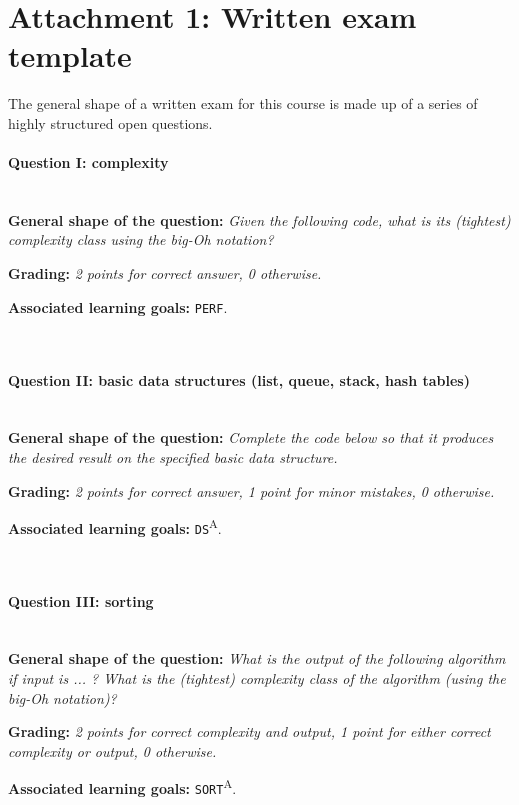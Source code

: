 \section*{Attachment 1: Written exam template}
The general shape of a written exam for this course is made up of a series of highly structured open questions.

\paragraph*{Question I: complexity} \ \\

\textbf{General shape of the question:} \textit{Given the following code, what is its (tightest) complexity class using the big-Oh notation?} \ 

\textbf{Grading:} \textit{2 points for correct answer, 0 otherwise.} \ 

\textbf{Associated learning goals:} \texttt{PERF}.

\ \\ 
\paragraph*{Question II: basic data structures (list, queue, stack, hash tables)} \ \\

\textbf{General shape of the question:} \textit{Complete the code below so that it produces the desired result on the specified basic data structure.} \ 

\textbf{Grading:} \textit{2 points for correct answer, 1 point for minor mistakes, 0 otherwise.} \ 

\textbf{Associated learning goals:} \texttt{DS}\textsuperscript{A}.

\ \\ 
\paragraph*{Question III: sorting} \ \\

\textbf{General shape of the question:} \textit{What is the output of the following algorithm if input is ... ? What is the (tightest) complexity class of the algorithm (using the big-Oh notation)?} \ 

\textbf{Grading:} \textit{2 points for correct complexity and output, 1 point for either correct complexity or output, 0 otherwise.} \ 

\textbf{Associated learning goals:} \texttt{SORT}\textsuperscript{A}.

